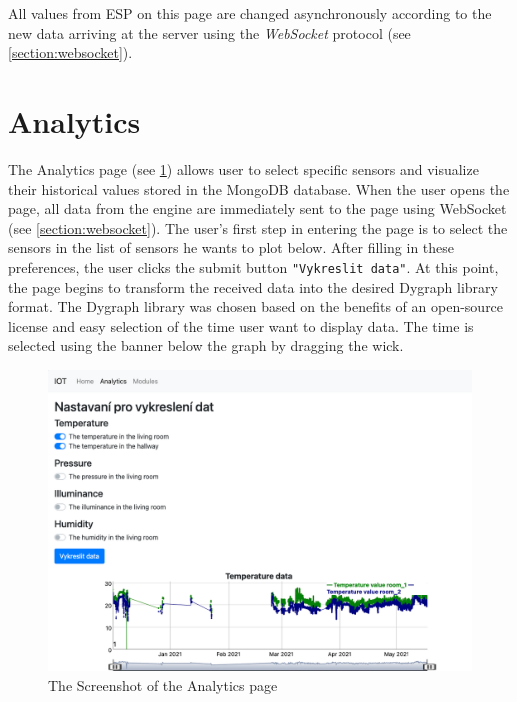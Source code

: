 All values from ESP on this page are changed asynchronously according to the new data arriving at the server using the \textit{WebSocket} protocol (see \cref{section:websocket}).

\section{Analytics}

The Analytics page (see \cref{fig:screenshot_analytics_graph}) allows user to select specific sensors and visualize their historical values stored in the MongoDB database. When the user opens the page, all data from the engine are immediately sent to the page using WebSocket (see \cref{section:websocket}). The user's first step in entering the page is to select the sensors in the list of sensors he wants to plot below. After filling in these preferences, the user clicks the submit button \texttt{"Vykreslit data"}. At this point, the page begins to transform the received data into the desired Dygraph library format. The Dygraph library was chosen based on the benefits of an open-source license and easy selection of the time user want to display data. The time is selected using the banner below the graph by dragging the wick.



\begin{figure}[H]
    \centering
    \includegraphics[width=\textwidth]{img/web_analytics.png}
    \caption{The Screenshot of the Analytics page}
    \label{fig:screenshot_analytics_graph}
\end{figure}

